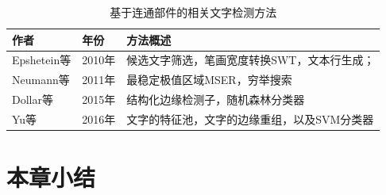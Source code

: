     \begin{table}[!h]
    \centering
    \caption{基于连通部件的相关文字检测方法}
    \begin{tabular}{p{}|p{}| p{}}
    \hline
    作者 & 年份 & 方法概述 \\
    \hline
    Epshetein等\cite{Epshtein2010Detecting} & 2010年 & 候选文字筛选，笔画宽度转换SWT，文本行生成；\\
    Neumann等\cite{Neumann2011Text} & 2011年 &   最稳定极值区域MSER，穷举搜索\\
    Dollar等\cite{Dollar2015Fast} & 2015年 & 结构化边缘检测子，随机森林分类器 \\
    Yu等\cite{Yu2016Scene} & 2016年 & 文字的特征池，文字的边缘重组，以及SVM分类器 \\
    \hline
    \end{tabular}
    \label{tab.c2_connected_component_based}
    \end{table}

    \section{本章小结}


